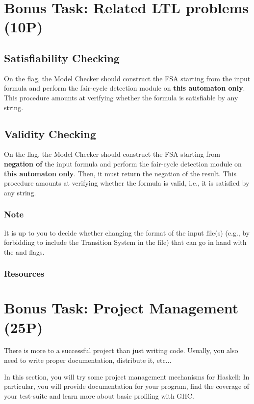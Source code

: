 \documentclass{article}
\begin{document}
\section{Bonus Task: Related LTL problems (10P)}

\subsection{Satisfiability Checking}
On the  flag, the Model Checker should construct the FSA starting from the input formula
and perform the fair-cycle detection module on \textbf{this automaton only}. 
This procedure amounts at verifying whether the formula is satisfiable by any string. 

\subsection{Validity Checking}
On the  flag, the Model Checker should construct the FSA starting from \textbf{negation of} 
the input formula and perform the fair-cycle detection module on \textbf{this automaton only}. 
Then, it must return the negation of the result.
This procedure amounts at verifying whether the formula is valid, i.e., it is satisfied by any string. 

\subsubsection*{Note}
It is up to you to decide whether changing the format of the input file(s)
(e.g., by forbidding to include the Transition System in the file) 
that can go in hand with the  and  flags.

\subsubsection*{Resources}
\cite[Section 5.2.2]{BaKa}


\section{Bonus Task: Project Management (25P)}

There is more to a successful project than just writing code. 
Usually, you also need to write proper documentation, distribute it, etc...

In this section, you will try some project management mechanisms for Haskell: 
In particular, you will provide documentation for your program, 
find the coverage of your test-suite and learn more about basic profiling with GHC.
\end{document}
